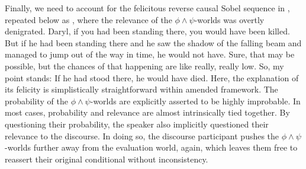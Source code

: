 Finally, we need to account for the felicitous reverse causal Sobel sequence in , repeated below as , where the relevance of the $\phi\land\psi$-worlds was overtly denigrated. 
\pex{}%
	\a{}Daryl, if you had been standing there, you would have been killed.
	\a{}But if he had been standing there and he saw the shadow of the falling beam and managed to jump out of the way in time, he would not have.
	\a{}Sure, that may be possible, but the chances of that happening are like really, really low. So, my point stands: If he had stood there, he would have died.\hfill\parencite[adapted and modified from][p. 134]{Klecha2014}
\xe
Here, the explanation of its felicity is simplistically straightforward within  amended framework. The probability of the $\phi\land\psi$-worlds are explicitly asserted to be highly improbable. In most cases, probability and relevance are almost intrinsically tied together.  By questioning their probability, the speaker also implicitly questioned their relevance to the discourse. In doing so, the discourse participant pushes the $\phi\land\psi$-worlds further away from the evaluation world, again, which leaves them free to reassert their original conditional without inconsistency. 

